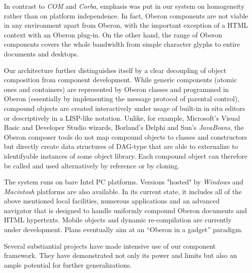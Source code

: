 \ein
In contrast to {\em COM\/} and {\em Corba\/}, emphasis was put in our
system on homogeneity rather than on platform independence. In fact,
Oberon components are not viable in any environment apart from Oberon,
with the important exception of a HTML context with an Oberon plug-in.
On the other hand, the range of Oberon components covers the whole
bandwidth from simple character glyphs to entire documents and desktops.

\ein
Our architecture further distinguishes itself by a clear decoupling of object
composition from component development. While generic components
(atomic ones and containers) are represented by Oberon classes and
programmed in Oberon (essentially by implementing the message protocol
of parental control), compound objects are created interactively under usage
of built-in in situ editors or descriptively in a LISP-like notation. Unlike,
for example, Microsoft's Visual Basic and Developer Studio wizards, 
Borland's Delphi and Sun's {\em JavaBeans\/}, the Oberon composer
tools do not map compound objects to classes and constructors
but directly create data structures of DAG-type that are able to externalize
to identifyable instances of some object library. Each compound object
can therefore be called and used alternatively by reference or by cloning.

\ein
The system runs on bare Intel PC platforms. Versions "hosted" by {\em
Windows\/}
and {\em Macintosh\/} platforms are also available. In its current state, it
includes all of the above mentioned local facilities, numerous applications
and an
advanced navigator that is designed to handle uniformly compound Oberon
documents
and HTML hypertexts. Mobile objects and dynamic re-compilation are currently
under development. Plans eventually aim at an ``Oberon in a gadget'' paradigm.

\ein
Several substiantial projects have made intensive use of our component
framework.
They have demonstrated not only its power and limits but also an ample
potential
for further generalizations. 

